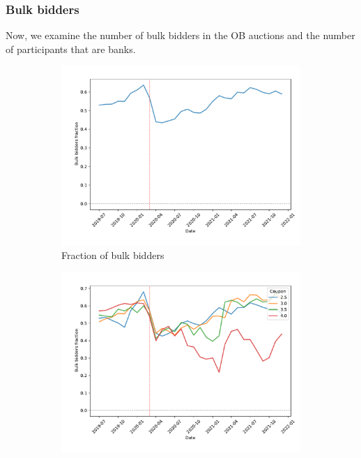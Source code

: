 \documentclass[11pt,a4paper]{article}
\begin{document}
\pagebreak
\subsubsection{Bulk bidders}

Now, we examine the number of bulk bidders in the OB auctions and the number of participants that are banks.

\begin{figure}[h]
  \centering
  \begin{subfigure}[b]{0.49\textwidth}
    \includegraphics[width=0.998\textwidth]{../results/figures/bulk_bidders_fraction_mean_mat30_loan1_timeseries_nrmonthly_2.5_4_.pdf}
    \caption{ Fraction of bulk bidders}
   \end{subfigure}
     \begin{subfigure}[b]{0.49\textwidth}
      \includegraphics[width=0.998\textwidth]{../results/figures/bulk_bidders_fraction_mean_mat30_loan1_timeseries_cpmonthly_2.5_4_.pdf}

\end{subfigure}
\end{figure}
\end{document}
